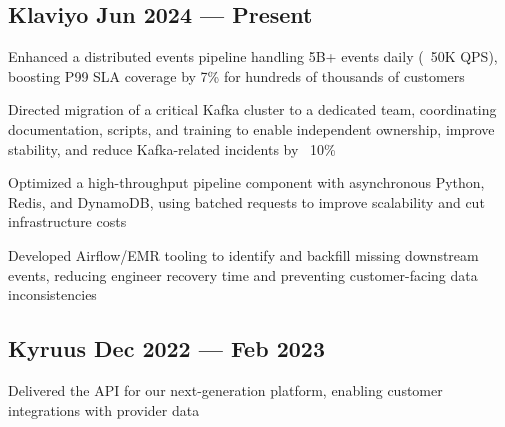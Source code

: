 
\subsection{{Klaviyo \hfill Jun 2024 --- Present}}
\begin{zitemize}
\item Enhanced a distributed events pipeline handling 5B+ events daily (~50K QPS), boosting P99 SLA coverage by 7\% for hundreds of thousands of customers
\item Directed migration of a critical Kafka cluster to a dedicated team, coordinating documentation, scripts, and training to enable independent ownership, improve stability, and reduce Kafka-related incidents by ~10\%
\item Optimized a high-throughput pipeline component with asynchronous Python, Redis, and DynamoDB, using batched requests to improve scalability and cut infrastructure costs
\item Developed Airflow/EMR tooling to identify and backfill missing downstream events, reducing engineer recovery time and preventing customer-facing data inconsistencies
\end{zitemize}


\subsection{{Kyruus \hfill Dec 2022 --- Feb 2023}}
\begin{zitemize}
\item Delivered the API for our next-generation platform, enabling customer integrations with provider data
\end{zitemize}

